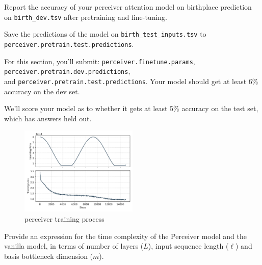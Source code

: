 \begin{parts}
Report the accuracy of your perceiver attention model on birthplace prediction on \texttt{birth\_dev.tsv} after pretraining and fine-tuning.

Save the predictions of the model on \texttt{birth\_test\_inputs.tsv} to \texttt{perceiver.pretrain.test.predictions}.

For this section, you'll submit: \texttt{perceiver.finetune.params}, \texttt{perceiver.pretrain.dev.predictions},\\ and \texttt{perceiver.pretrain.test.predictions}. Your model should get at least 6\% accuracy on the dev set.
    
\begin{subparts}

\subpart[8]  We'll score your model as to whether it gets at least 5\% accuracy on the test set, which has answers held out.
\begin{figure}[h]
        \centering
        \includegraphics[width=0.5\textwidth]{../code/perceiver_training_process.png}
        \caption{perceiver training process}
        \label{fig:perceiver_training_process}
\end{figure}


\subpart[2] Provide an expression for the time complexity of the Perceiver model and the vanilla model, in terms of number of layers ($L$), input sequence length ($\ell$) and basis bottleneck dimension ($m$). 



\end{subparts}
\end{parts}
